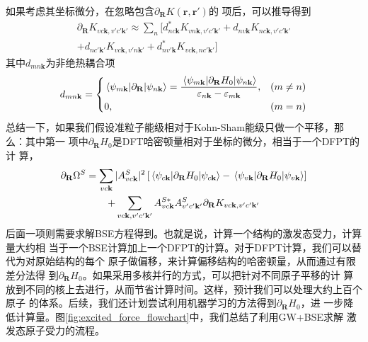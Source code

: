 {\begin{equation}
  \end{equation}
  如果考虑其坐标微分，在忽略包含$\partial_\mathbf{R}K(\mathbf{r},\mathbf{r'})$的
  项后，可以推导得到
  \begin{multline}
    \partial_\mathbf{R}K_{vc\mathbf{k},v'c'\mathbf{k}'}  
    \approx
    \sum_n \biggl[
      d^*_{nc\mathbf{k}}K_{vn\mathbf{k},v'c'\mathbf{k}'}  
      +
      d_{nv\mathbf{k}}K_{nc\mathbf{k},v'c'\mathbf{k}'}  
      \\
      +
      d_{nc'\mathbf{k}'}K_{vc\mathbf{k},v'n\mathbf{k}'}  
      +
      d^*_{nv'\mathbf{k}}K_{vc\mathbf{k},nc'\mathbf{k}'}  
    \biggr]
  \end{multline}
  其中$d_{mn\mathbf{k}}$为非绝热耦合项
  \begin{equation}
    d_{mn\mathbf{k}}
    =
    \begin{cases}
      \mel{\psi_{m\mathbf{k}}}{\partial_\mathbf{R}}{\psi_{n\mathbf{k}}}
      =
      \dfrac{
        \mel{\psi_{m\mathbf{k}}}{\partial_\mathbf{R} H_0}{\psi_{n\mathbf{k}}}
      }{
        \varepsilon_{n\mathbf{k}} - \varepsilon_{m\mathbf{k}}
      }, & (m\ne n)
      \\[6pt]
      0, & (m=n)
    \end{cases}
  \end{equation}
  总结一下，如果我们假设准粒子能级相对于Kohn-Sham能级只做一个平移，那么：其中第一
  项中$\partial_\mathbf{R}H_0$是DFT哈密顿量相对于坐标的微分，相当于一个DFPT的计
  算，
  \begin{multline}
    \partial_\mathbf{R} \Omega^S
    =
    \sum_{vc\mathbf{k}}
    |A^S_{vc\mathbf{k}}|^2 \left[
      \mel{\psi_{c\mathbf{k}}}{\partial_\mathbf{R} H_0}{\psi_{c\mathbf{k}}}
      -
      \mel{\psi_{v\mathbf{k}}}{\partial_\mathbf{R} H_0}{\psi_{v\mathbf{k}}}
    \right]
    \\
    +
    \sum_{vc\mathbf{k}, v'c'\mathbf{k}'}
    A^{S*}_{vc\mathbf{k}}
    A^{S}_{v'c'\mathbf{k}'}
    \partial_\mathbf{R} K_{vc\mathbf{k}, v'c'\mathbf{k}'}
  \end{multline}
  后面一项则需要求解BSE方程得到。也就是说，计算一个结构的激发态受力，计算量大约相
  当于一个BSE计算加上一个DFPT的计算。对于DFPT计算，我们可以替代为对原始结构的每个
  原子做偏移，来计算偏移结构的哈密顿量，从而通过有限差分法得
  到$\partial_\mathbf{R}H_0$。如果采用多核并行的方式，可以把针对不同原子平移的计
  算放到不同的核上去进行，从而节省计算时间。这样，预计我们可以处理大约上百个原子
  的体系。后续，我们还计划尝试利用机器学习的方法得到$\partial_\mathbf{R} H_0$，进
  一步降低计算量。图\ref{fig:excited_force_flowchart}中，我们总结了利用GW+BSE求解
  激发态原子受力的流程。

}
